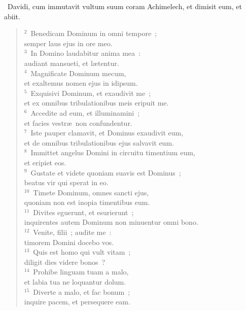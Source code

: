 ~\lettrine[lines=10,image=true,loversize=0.05,lraise=-0.03]{D}{}avidi, cum immutavit vultum suum coram Achimelech, et dimisit eum, et abiit.
\begin{flushleft}\begin{verse}\vspace{6pt}${}^{2}$~Benedicam Dominum in omni tempore~;\\ semper laus ejus in ore meo.\\
${}^{3}$~In Domino laudabitur anima mea~:\\ audiant mansueti, et l\ae tentur.\\
${}^{4}$~Magnificate Dominum mecum,\\ et exaltemus nomen ejus in idipsum.\\
${}^{5}$~Exquisivi Dominum, et exaudivit me~;\\ et ex omnibus tribulationibus meis eripuit me.\\
${}^{6}$~Accedite ad eum, et illuminamini~;\\ et facies vestr\ae\ non confundentur.\\
${}^{7}$~Iste pauper clamavit, et Dominus exaudivit eum,\\ et de omnibus tribulationibus ejus salvavit eum.\\
${}^{8}$~Immittet angelus Domini in circuitu timentium eum,\\ et eripiet eos.\\
${}^{9}$~Gustate et videte quoniam suavis est Dominus~;\\ beatus vir qui sperat in eo.\\
${}^{10}$~Timete Dominum, omnes sancti ejus,\\ quoniam non est inopia timentibus eum.\\
${}^{11}$~Divites eguerunt, et esurierunt~;\\ inquirentes autem Dominum non minuentur omni bono.\\
${}^{12}$~Venite, filii~; audite me~:\\ timorem Domini docebo vos.\\
${}^{13}$~Quis est homo qui vult vitam~;\\ diligit dies videre bonos~?\\
${}^{14}$~Prohibe linguam tuam a malo,\\ et labia tua ne loquantur dolum.\\
${}^{15}$~Diverte a malo, et fac bonum~;\\ inquire pacem, et persequere eam.\\

\end{verse}
\end{flushleft}
